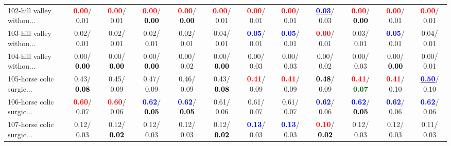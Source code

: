 \begin{table}[h]
\begin{center}
{\begin{tabular}{lc|c|c|c|c|c|c|c|c|c|c}
102-hill valley withou... & \textcolor{red}{\textbf{  0.00}}/  0.01 & \textcolor{red}{\textbf{  0.00}}/  0.01 & \textcolor{red}{\textbf{  0.00}}/\textcolor{black}{\textbf{  0.00}} & \textcolor{red}{\textbf{  0.00}}/\textcolor{black}{\textbf{  0.00}} & \textcolor{red}{\textbf{  0.00}}/  0.01 & \textcolor{red}{\textbf{  0.00}}/  0.01 & \textcolor{red}{\textbf{  0.00}}/  0.01 & \underline{\textcolor{blue}{\textbf{  0.03}}}/  0.03 & \textcolor{red}{\textbf{  0.00}}/\textcolor{black}{\textbf{  0.00}} & \textcolor{red}{\textbf{  0.00}}/  0.01 & \textcolor{red}{\textbf{  0.00}}/  0.01 \\
103-hill valley withou... &   0.02/  0.01 &   0.02/  0.01 &   0.02/  0.01 &   0.02/  0.01 &   0.04/  0.01 & \textcolor{blue}{\textbf{  0.05}}/  0.01 & \textcolor{blue}{\textbf{  0.05}}/  0.01 & \textcolor{red}{\textbf{  0.00}}/  0.01 &   0.03/  0.01 & \textcolor{blue}{\textbf{  0.05}}/  0.01 &   0.04/  0.01 \\ \hline
104-hill valley withou... &   0.00/\textcolor{black}{\textbf{  0.00}} &   0.00/\textcolor{black}{\textbf{  0.00}} &   0.00/\textcolor{black}{\textbf{  0.00}} &   0.00/  0.02 &   0.00/\textcolor{black}{\textbf{  0.00}} &   0.00/  0.03 &   0.00/  0.03 &   0.00/  0.02 &   0.00/  0.03 &   0.00/\textcolor{black}{\textbf{  0.00}} &   0.00/  0.01 \\
105-horse colic surgic... &   0.43/\textcolor{black}{\textbf{  0.08}} &   0.45/  0.09 &   0.47/  0.09 &   0.46/  0.09 &   0.43/\textcolor{black}{\textbf{  0.08}} & \textcolor{red}{\textbf{  0.41}}/  0.09 & \textcolor{red}{\textbf{  0.41}}/  0.09 & \textcolor{black}{\textbf{  0.48}}/  0.09 & \textcolor{red}{\textbf{  0.41}}/\textcolor{darkgreen}{\textbf{  0.07}} & \textcolor{red}{\textbf{  0.41}}/  0.10 & \underline{\textcolor{blue}{\textbf{  0.50}}}/  0.10 \\
106-horse colic surgic... & \textcolor{red}{\textbf{  0.60}}/  0.07 & \textcolor{red}{\textbf{  0.60}}/  0.06 & \textcolor{blue}{\textbf{  0.62}}/\textcolor{black}{\textbf{  0.05}} & \textcolor{blue}{\textbf{  0.62}}/\textcolor{black}{\textbf{  0.05}} &   0.61/  0.06 &   0.61/  0.07 &   0.61/  0.07 & \textcolor{blue}{\textbf{  0.62}}/  0.06 & \textcolor{blue}{\textbf{  0.62}}/\textcolor{black}{\textbf{  0.05}} & \textcolor{blue}{\textbf{  0.62}}/  0.06 & \textcolor{blue}{\textbf{  0.62}}/  0.06 \\
107-horse colic surgic... &   0.12/  0.03 &   0.12/\textcolor{black}{\textbf{  0.02}} &   0.12/  0.03 &   0.12/  0.03 &   0.12/\textcolor{black}{\textbf{  0.02}} & \textcolor{blue}{\textbf{  0.13}}/  0.03 & \textcolor{blue}{\textbf{  0.13}}/  0.03 & \textcolor{red}{\textbf{  0.10}}/\textcolor{black}{\textbf{  0.02}} &   0.12/  0.03 &   0.12/  0.03 &   0.11/  0.03 \\

\end{tabular}}
\end{center}
\end{table}
